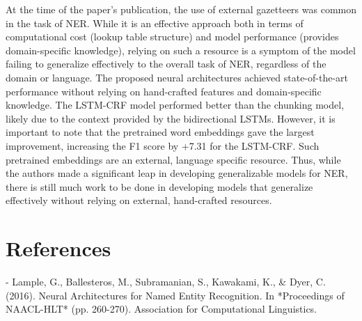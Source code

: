 \documentclass[11pt]{article}
\begin{document}
At the time of the paper's
publication, the use of external gazetteers was common in the 
task of NER. While it is an effective approach
both in terms of computational cost (lookup table structure) 
and model performance (provides domain-specific knowledge), 
relying on such a resource is a symptom
of the model failing to generalize effectively to the overall
task of NER, regardless of the domain or language.
The proposed neural architectures achieved
state-of-the-art performance without relying on hand-crafted features and
domain-specific knowledge. The LSTM-CRF model performed better than
the chunking model, likely due to the
context provided by the bidirectional LSTMs.
However, it is important to note that the 
pretrained word embeddings gave the largest 
improvement, increasing the F1 score 
by +7.31 for the LSTM-CRF.
Such pretrained embeddings are an external, 
language specific resource. Thus, while
the authors made a significant leap
in developing generalizable models
for NER, there is still much work to be done
in developing models that generalize effectively
without relying on external, hand-crafted resources.

\section*{References}
- Lample, G., Ballesteros, M., Subramanian, S., Kawakami, K., \& Dyer, C. (2016). Neural Architectures for Named Entity Recognition. In *Proceedings of NAACL-HLT* (pp. 260-270). Association for Computational Linguistics.
\end{document}

